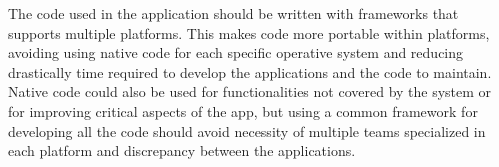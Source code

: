 The code used in the application should be written with frameworks that supports multiple platforms. This makes code more portable within platforms, avoiding using native code for each specific operative system and reducing drastically time required to develop the applications and the code to maintain. Native code could also be used for functionalities not covered by the system or for improving critical aspects of the app, but using a common framework for developing all the code should avoid necessity of multiple teams specialized in each platform and discrepancy between the applications.